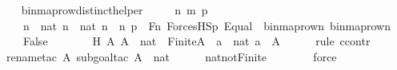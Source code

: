 \begin{isabellebody}
{\isafoldproof}%
%
\isadelimproof
\ \isanewline
%
\endisadelimproof
\isanewline
{}\isamarkupfalse%
\ binmap{\isacharunderscore}{\kern0pt}row{\isacharprime}{\kern0pt}{\isacharunderscore}{\kern0pt}distinct{\isacharunderscore}{\kern0pt}helper\ {\isacharcolon}{\kern0pt}\ \isanewline
\ \ \ n\ m\ p\isanewline
\ \ \ {\isachardoublequoteopen}n\ {\isasymin}\ nat{\isachardoublequoteclose}\ {\isachardoublequoteopen}n{\isacharprime}{\kern0pt}\ {\isasymin}\ nat{\isachardoublequoteclose}\ {\isachardoublequoteopen}n\ {\isasymnoteq}\ n{\isacharprime}{\kern0pt}{\isachardoublequoteclose}\ {\isachardoublequoteopen}p\ {\isasymin}\ Fn{\isachardoublequoteclose}\ {\isachardoublequoteopen}ForcesHS{\isacharparenleft}{\kern0pt}p{\isacharcomma}{\kern0pt}\ Equal{\isacharparenleft}{\kern0pt}{}{\isacharcomma}{\kern0pt}\ {}{\isacharparenright}{\kern0pt}{\isacharcomma}{\kern0pt}\ {\isacharbrackleft}{\kern0pt}binmap{\isacharunderscore}{\kern0pt}row{\isacharprime}{\kern0pt}{\isacharparenleft}{\kern0pt}n{\isacharparenright}{\kern0pt}{\isacharcomma}{\kern0pt}\ binmap{\isacharunderscore}{\kern0pt}row{\isacharprime}{\kern0pt}{\isacharparenleft}{\kern0pt}n{\isacharprime}{\kern0pt}{\isacharparenright}{\kern0pt}{\isacharbrackright}{\kern0pt}{\isacharparenright}{\kern0pt}{\isachardoublequoteclose}\ \isanewline
\ \ \ False\ \isanewline
%
\isadelimproof
%
\endisadelimproof
%
\isatagproof
{}\isamarkupfalse%
\ {\isacharminus}{\kern0pt}\ \isanewline
\ \ \isamarkupfalse%
\ H{\isacharcolon}{\kern0pt}\ {\isachardoublequoteopen}{\isasymAnd}A{\isachardot}{\kern0pt}\ A\ {\isasymsubseteq}\ nat\ {\isasymLongrightarrow}\ Finite{\isacharparenleft}{\kern0pt}A{\isacharparenright}{\kern0pt}\ {\isasymLongrightarrow}\ {\isasymexists}a\ {\isasymin}\ nat{\isachardot}{\kern0pt}\ a\ {\isasymnotin}\ A{\isachardoublequoteclose}\ \isanewline
\ \ \ \ \isamarkupfalse%
{\isacharparenleft}{\kern0pt}rule\ ccontr{\isacharparenright}{\kern0pt}\isanewline
\ \ \ \ \isamarkupfalse%
{\isacharparenleft}{\kern0pt}rename{\isacharunderscore}{\kern0pt}tac\ A{\isacharcomma}{\kern0pt}\ subgoal{\isacharunderscore}{\kern0pt}tac\ {\isachardoublequoteopen}A\ {\isacharequal}{\kern0pt}\ nat{\isachardoublequoteclose}{\isacharparenright}{\kern0pt}\isanewline
\ \ \ \ \isamarkupfalse%
\ nat{\isacharunderscore}{\kern0pt}not{\isacharunderscore}{\kern0pt}Finite\ \isanewline
\ \ \ \ \ \isamarkupfalse%
\ force\ \isanewline
\ \ \ \ \isamarkupfalse%

\end{isabellebody}
